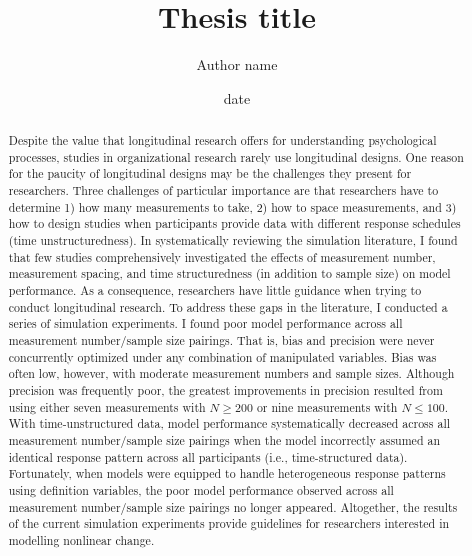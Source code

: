 \documentclass[
12pt, %
twoside,
english]{guelphthesis}
\title{Thesis title}
\author{Author name}
\date{date}
\let\cleardoublepage\clearpage
\let\oldfrontmatter\frontmatter
\renewcommand{\frontmatter}{
  \oldfrontmatter
  
  
   \pagestyle{frontmatter} %
}
\begin{document}
\frontmatter %

  \maketitle

\setcounter{page}{2} %

\cleardoublepage
  \begin{abstract}{2}{Despite the value that longitudinal research offers for understanding psychological processes, studies in organizational research rarely use longitudinal designs. One reason for the paucity of longitudinal designs may be the challenges they present for researchers. Three challenges of particular importance are that researchers have to determine 1) how many measurements to take, 2) how to space measurements, and 3) how to design studies when participants provide data with different response schedules (time unstructuredness). In systematically reviewing the simulation literature, I found that few studies comprehensively investigated the effects of measurement number, measurement spacing, and time structuredness (in addition to sample size) on model performance. As a consequence, researchers have little guidance when trying to conduct longitudinal research. To address these gaps in the literature, I conducted a series of simulation experiments. I found poor model performance across all measurement number/sample size pairings. That is, bias and precision were never concurrently optimized under any combination of manipulated variables. Bias was often low, however, with moderate measurement numbers and sample sizes. Although precision was frequently poor, the greatest improvements in precision resulted from using either seven measurements with \(N \ge 200\) or nine measurements with \(N \le 100\). With time-unstructured data, model performance systematically decreased across all measurement number/sample size pairings when the model incorrectly assumed an identical response pattern across all participants (i.e., time-structured data). Fortunately, when models were equipped to handle heterogeneous response patterns using definition variables, the poor model performance observed across all measurement number/sample size pairings no longer appeared. Altogether, the results of the current simulation experiments provide guidelines for researchers interested in modelling nonlinear change.}  %
  \end{abstract}
\end{document}
